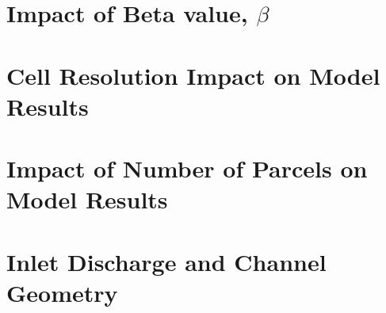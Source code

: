 \documentclass[letterpaper, oneside, final]{memoir}
\begin{document}
\chapter{Impact of Beta value, $\beta$}


\chapter{Cell Resolution Impact on Model Results}


\chapter{Impact of Number of Parcels on Model Results}


\chapter{Inlet Discharge and Channel Geometry}



\end{document}
